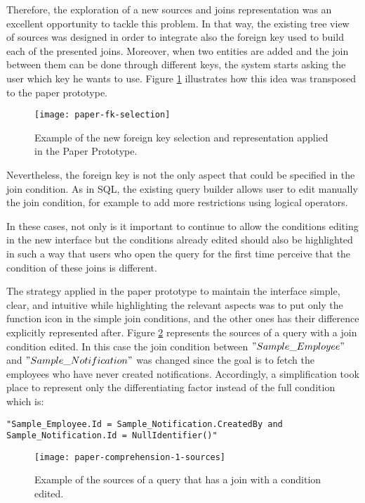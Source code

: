 Therefore, the exploration of a new sources and joins representation was an excellent opportunity to tackle this problem. In that way, the existing tree view of sources was designed in order to integrate also the foreign key used to build each of the presented joins. Moreover, when two entities are added and the join between them can be done through different keys, the system starts asking the user which key he wants to use. Figure \ref{fig:paperFkSelect} illustrates how this idea was transposed to the paper prototype.

\begin{figure}[htbp]
	\centering
  \texttt{[image: paper-fk-selection]}
	\caption{Example of the new foreign key selection and representation applied in the Paper Prototype.}
	\label{fig:paperFkSelect}
\end{figure}

Nevertheless, the foreign key is not the only aspect that could be specified in the join condition. As in SQL, the existing query builder allows user to edit manually the join condition, for example to add more restrictions using logical operators.

In these cases, not only is it important to continue to allow the conditions editing in the new interface but the conditions already edited should also be highlighted in such a way that users who open the query for the first time perceive that the condition of these joins is different. 

The strategy applied in the paper prototype to maintain the interface simple, clear, and intuitive while highlighting the relevant aspects was to put only the function icon in the simple join conditions, and the other ones has their difference explicitly represented after. Figure \ref{fig:paperComprehension1Sources} represents the sources of a query with a join condition edited. In this case the join condition between $"Sample\_Employee"$ and $"Sample\_Notification"$ was changed since the goal is to fetch the employees who have never created notifications. Accordingly, a simplification took place to represent only the differentiating factor instead of the full condition which is:

\begin{center}
  \verb|"Sample_Employee.Id = Sample_Notification.CreatedBy and| 
  \\
  \verb|Sample_Notification.Id = NullIdentifier()"|
\end{center}

\begin{figure}[htbp]
	\centering
  \texttt{[image: paper-comprehension-1-sources]}
	\caption{Example of the sources of a query that has a join with a condition edited.}
	\label{fig:paperComprehension1Sources}
\end{figure}

